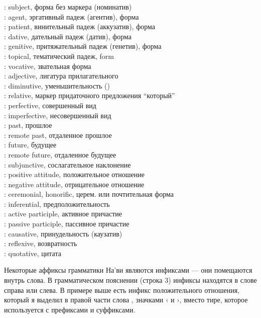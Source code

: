\begin{multicols}{2}
\noindent{}: subject, форма без маркера (номинатив) \\
: agent, эргативный падеж (агентив), форма  \\
: patient, винительный падеж (аккузатив), форма  \\
: dative, дательный падеж (датив), форма  \\
: genitive, притяжательный падеж (генетив), форма
 \\
: topical, тематический падеж,  form \\
: vocative, звательная форма  \\
: adjective, лигатура прилагательного  \\
: diminutive, уменьшительность () \\
: relative, маркер придаточного предложения ``который''  \\
: perfective, совершенный вид \\
: imperfective, несовершенный вид \\
: past, прошлое \\
: remote past, отдаленное прошлое \\
: future, будущее \\
: remote future, отдаленное будущее \\
: subjunctive, сослагательное наклонение \\
: positive attitude, положительное отношение \\
: negative attitude, отрицательное отношение \\
: ceremonial, honorific, церем. или почтительная форма \\
: inferential, предположительность \\
: active participle, активное причастие \\
: passive participle, пассивное причастие \\
: causative, принудельность (каузатив) \\
: reflexive, возвратность \\
: quotative, цитата 
\end{multicols}

\noindent Некоторые аффиксы грамматики На'ви являются инфиксами
— они помещаются внутрь слова. В грамматическом пояснении
(строка 3) инфиксы находятся в слове справа или слева. В примере
выше есть инфикс положительного отношения, который я выделил в
правой части слова , значками ‹
и ›, вместо тире, которое используется с префиксами и
суффиксами.

